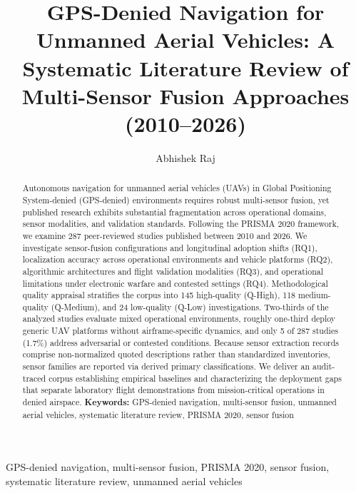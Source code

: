 \documentclass[conference]{IEEEtran}
\begin{document}
\title{GPS-Denied Navigation for Unmanned Aerial Vehicles: A Systematic Literature Review of Multi-Sensor Fusion Approaches (2010–2026)}
\author{Abhishek Raj}
\maketitle

\begin{abstract}
Autonomous navigation for unmanned aerial vehicles (UAVs) in Global Positioning System-denied (GPS-denied) environments requires robust multi-sensor fusion, yet published research exhibits substantial fragmentation across operational domains, sensor modalities, and validation standards. Following the PRISMA 2020 framework, we examine 287 peer-reviewed studies published between 2010 and 2026. We investigate sensor-fusion configurations and longitudinal adoption shifts (RQ1), localization accuracy across operational environments and vehicle platforms (RQ2), algorithmic architectures and flight validation modalities (RQ3), and operational limitations under electronic warfare and contested settings (RQ4). Methodological quality appraisal stratifies the corpus into 145 high-quality (Q-High), 118 medium-quality (Q-Medium), and 24 low-quality (Q-Low) investigations. Two-thirds of the analyzed studies evaluate mixed operational environments, roughly one-third deploy generic UAV platforms without airframe-specific dynamics, and only 5 of 287 studies (1.7\%) address adversarial or contested conditions. Because sensor extraction records comprise non-normalized quoted descriptions rather than standardized inventories, sensor families are reported via derived primary classifications. We deliver an audit-traced corpus establishing empirical baselines and characterizing the deployment gaps that separate laboratory flight demonstrations from mission-critical operations in denied airspace. \textbf{Keywords:} GPS-denied navigation, multi-sensor fusion, unmanned aerial vehicles, systematic literature review, PRISMA 2020, sensor fusion
\end{abstract}

\begin{IEEEkeywords}
GPS-denied navigation, multi-sensor fusion, PRISMA 2020, sensor fusion, systematic literature review, unmanned aerial vehicles
\end{IEEEkeywords}

\end{document}
